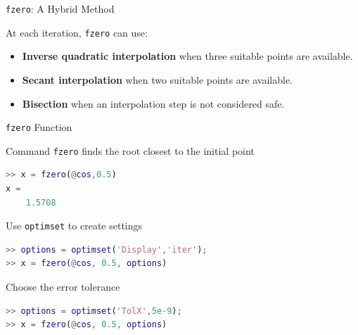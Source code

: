 \documentclass[10pt]{beamer}
\begin{document}
\begin{frame}{\texttt{fzero}: A Hybrid Method}


At each iteration, \texttt{fzero} can use:
\begin{itemize}

    \item \textbf{Inverse quadratic interpolation}
    when three suitable points are available.

    \item<2-> \textbf{Secant interpolation}
    when two suitable points are available.

    \item<3-> \textbf{Bisection}
    when an interpolation step is not considered safe.

\end{itemize}

\vfill



\end{frame}


\begin{frame}[fragile]{\texttt{fzero} Function}



Command \texttt{fzero} finds the root closest to the initial point
\begin{lstlisting}[language=matlab]
>> x = fzero(@cos,0.5)
x =
    1.5708
\end{lstlisting}


\vfill 
Use \texttt{optimset} to create settings 
\begin{lstlisting}[language=matlab]
>> options = optimset('Display','iter');
>> x = fzero(@cos, 0.5, options)
\end{lstlisting}

\vfill 
Choose the error tolerance
\vspace{0.0cm}
\begin{lstlisting}[language=matlab]
>> options = optimset('TolX',5e-9);
>> x = fzero(@cos, 0.5, options)
\end{lstlisting}
\end{frame}

\end{document}
